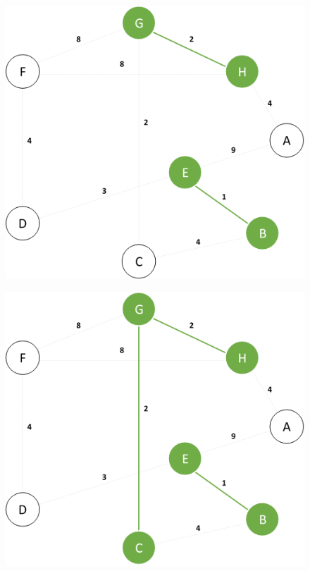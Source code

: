 \documentclass{article}
\begin{document}
\begin{figure}[H]
\centering
\includegraphics[scale=0.6]{images/Q3/03.png}
\end{figure}

\begin{figure}[H]
\centering
\includegraphics[scale=0.6]{images/Q3/04.png}
\end{figure}
\end{document}
